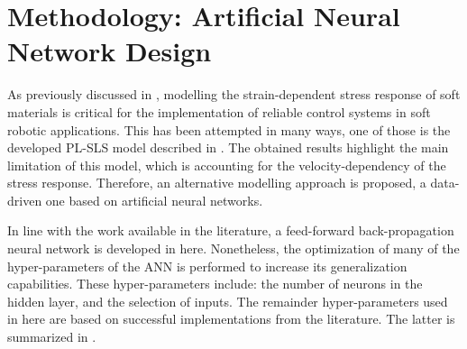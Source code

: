 \section{Methodology: Artificial Neural Network Design}

As previously discussed in , modelling the strain-dependent stress response of soft materials is critical for the implementation of reliable control systems in soft robotic applications. This has been attempted in many ways, one of those is the developed PL-SLS model described in . The obtained results highlight the main limitation of this model, which is accounting for the velocity-dependency of the stress response. Therefore, an alternative modelling approach is proposed, a data-driven one based on artificial neural networks.

In line with the work available in the literature, a feed-forward back-propagation neural network is developed in here. Nonetheless, the optimization of many of the hyper-parameters of the ANN is performed to increase its generalization capabilities. These hyper-parameters include: the number of neurons in the hidden layer, and the selection of inputs. The remainder hyper-parameters used in here are based on successful implementations from the literature. The latter is summarized in .

